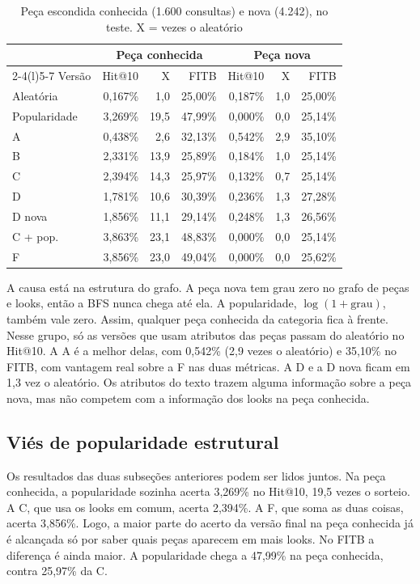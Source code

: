 \documentclass[conference]{IEEEtran}
\begin{document}
\begin{table}[t]
\caption{Peça escondida conhecida (1.600 consultas) e nova (4.242), no teste. X = vezes o aleatório}
\label{tab:conhecida}
\centering
\footnotesize
\setlength{\tabcolsep}{3pt}
\begin{tabular}{@{}lrrrrrr@{}}
\toprule
& \multicolumn{3}{c}{Peça conhecida} & \multicolumn{3}{c}{Peça nova} \\
\cmidrule(lr){2-4}\cmidrule(l){5-7}
Versão & Hit@10 & X & FITB & Hit@10 & X & FITB \\
\midrule
Aleatória & 0,167\% & 1,0 & 25,00\% & 0,187\% & 1,0 & 25,00\% \\
Popularidade & 3,269\% & 19,5 & 47,99\% & 0,000\% & 0,0 & 25,14\% \\
A & 0,438\% & 2,6 & 32,13\% & 0,542\% & 2,9 & 35,10\% \\
B & 2,331\% & 13,9 & 25,89\% & 0,184\% & 1,0 & 25,14\% \\
C & 2,394\% & 14,3 & 25,97\% & 0,132\% & 0,7 & 25,14\% \\
D & 1,781\% & 10,6 & 30,39\% & 0,236\% & 1,3 & 27,28\% \\
D nova & 1,856\% & 11,1 & 29,14\% & 0,248\% & 1,3 & 26,56\% \\
C + pop. & 3,863\% & 23,1 & 48,83\% & 0,000\% & 0,0 & 25,14\% \\
F & 3,856\% & 23,0 & 49,04\% & 0,000\% & 0,0 & 25,62\% \\
\bottomrule
\end{tabular}
\end{table}

A causa está na estrutura do grafo. A peça nova tem grau zero no grafo de peças e looks, então a BFS nunca chega até ela. A popularidade, $\log(1 + \text{grau})$, também vale zero. Assim, qualquer peça conhecida da categoria fica à frente. Nesse grupo, só as versões que usam atributos das peças passam do aleatório no Hit@10. A A é a melhor delas, com 0,542\% (2,9 vezes o aleatório) e 35,10\% no FITB, com vantagem real sobre a F nas duas métricas. A D e a D nova ficam em 1,3 vez o aleatório. Os atributos do texto trazem alguma informação sobre a peça nova, mas não competem com a informação dos looks na peça conhecida.

\subsection{Viés de popularidade estrutural}

Os resultados das duas subseções anteriores podem ser lidos juntos. Na peça conhecida, a popularidade sozinha acerta 3,269\% no Hit@10, 19,5 vezes o sorteio. A C, que usa os looks em comum, acerta 2,394\%. A F, que soma as duas coisas, acerta 3,856\%. Logo, a maior parte do acerto da versão final na peça conhecida já é alcançada só por saber quais peças aparecem em mais looks. No FITB a diferença é ainda maior. A popularidade chega a 47,99\% na peça conhecida, contra 25,97\% da C.
\end{document}
